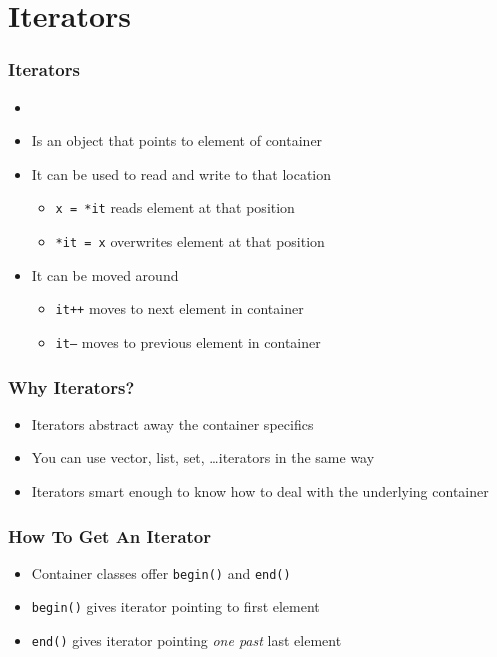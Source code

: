 \section{Iterators}

\frame{\tableofcontents[currentsection]}

\begin{frame}
  \frametitle{Iterators}
  \begin{itemize}
    \item {}
    \item Is an object that points to element of container
    \item It can be used to read and write to that location
          \begin{itemize}
            \item \texttt{x = *it} reads element at that position
            \item \texttt{*it = x} overwrites element at that position
          \end{itemize}
    \item It can be moved around
          \begin{itemize}
            \item \texttt{it++} moves to next element in container
            \item \texttt{it--} moves to previous element in container
          \end{itemize}
  \end{itemize}
\end{frame}

\begin{frame}
  \frametitle{Why Iterators?}
  \begin{itemize}
    \item Iterators abstract away the container specifics
    \item You can use vector, list, set, \dots iterators in the same way
    \item Iterators smart enough to know how to deal with the underlying container
  \end{itemize}
\end{frame}

\begin{frame}
  \frametitle{How To Get An Iterator}
  \begin{itemize}
    \item Container classes offer \texttt{begin()} and \texttt{end()}
    \item \texttt{begin()} gives iterator pointing to first element
    \item \texttt{end()} gives iterator pointing \emph{one past} last element
  \end{itemize}
\end{frame}


